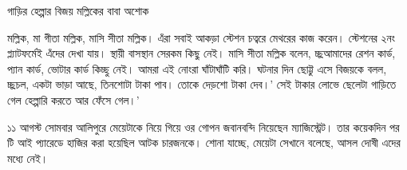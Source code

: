 \documentclass{article}
\begin{document}
\begin{minipage}[t]{124mm}
\begin{multicols}{2}
	গাড়ির হেল্পার বিজয় মল্লিকের বাবা অশোক \begin{table}
\hfill %
\end{table}মল্লিক, মা গীতা মল্লিক, মাসি সীতা মল্লিক। এঁরা সবাই আকড়া স্টেশন চত্বরে মেথরের কাজ করেন। স্টেশনের ২নং প্ল্যাটফর্মেই এঁদের দেখা যায়। স্থায়ী বাসস্থান সেরকম কিছু নেই। মাসি সীতা মল্লিক বলেন, চ্ছ্রআমাদের রেশন কার্ড, প্যান কার্ড, ভোটার কার্ড কিচ্ছু নেই। আমরা এই নোংরা ঘাঁটাঘাঁটি করি। ঘটনার দিন ছোট্টু এসে বিজয়কে বলল, চ্ছ্রচল, একটা ভাড়া আছে, তিনশোটা টাকা পাব। তোকে দেড়শো টাকা দেব।' সেই টাকার লোভে ছেলেটা গাড়িতে গেল হেল্পারি করতে আর ফেঁসে গেল।' 

	১১ আগস্ট সোমবার আলিপুরে মেয়েটাকে নিয়ে গিয়ে ওর গোপন জবানবন্দি নিয়েছেন ম্যাজিস্ট্রেট। তার কয়েকদিন পর টি আই প্যারেডে হাজির করা হয়েছিল আটক চারজনকে। শোনা যাচ্ছে, মেয়েটা সেখানে বলেছে, আসল দোষী এদের মধ্যে নেই।
\end{multicols}
%
\end{minipage}
%
\end{document}

